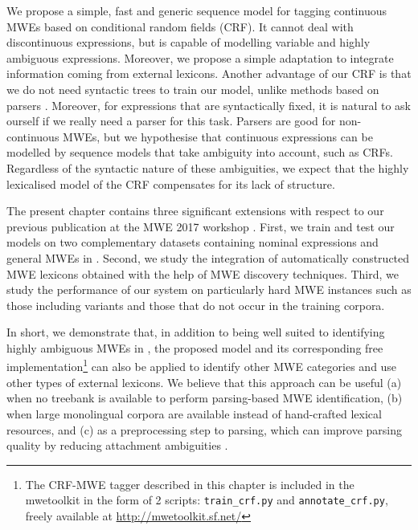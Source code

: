 \documentclass[output=paper,
modfonts
]{langscibook}
\begin{document}
We propose a simple, fast and generic sequence model for tagging continuous MWEs based on conditional random fields (CRF). 
It cannot deal with discontinuous expressions, but is capable of modelling variable and highly ambiguous expressions. 
Moreover, we propose a simple adaptation to integrate information coming from external lexicons. 
Another advantage of our CRF is that we do not need syntactic trees to train our model, unlike methods based on parsers \citep{leroux:hal-01074298,nasr:acl:2015,constant-nivre:acl:2016}. 
Moreover, for expressions that are syntactically fixed, it is natural to ask ourself if we really need a parser for this task. 
Parsers are good for non-continuous MWEs, but we hypothesise that continuous expressions can be modelled by sequence models that take ambiguity into account, such as CRFs. 
Regardless of the syntactic nature of these ambiguities, we expect that the highly lexicalised model of the CRF compensates for its lack of structure.

The present chapter contains three significant extensions with respect to our previous publication at the MWE 2017 workshop \citep{scholivet-ramisch:2017:MWE2017}. 
First, we train and test our models on two complementary datasets containing nominal expressions and general MWEs in . 
Second, we study the integration of automatically constructed MWE lexicons obtained with the help of MWE discovery techniques.
Third, we study the performance of our system on particularly hard MWE instances such as those including variants and those that do not occur in the training corpora.

In short, we demonstrate that, in addition to being well suited to identifying highly ambiguous MWEs in  \citep{scholivet-ramisch:2017:MWE2017}, the proposed model and its corresponding free implementation\footnote{The CRF-MWE tagger described in this chapter is included in the mwetoolkit in the form of 2 scripts: \texttt{train\_crf.py} and \texttt{annotate\_crf.py}, freely available at \url{http://mwetoolkit.sf.net/} } can also be applied to identify other MWE categories and use other types of external lexicons.
We believe that this approach can be useful (a) when no treebank is available to perform parsing-based MWE identification, (b) when large monolingual corpora are available instead of hand-crafted lexical resources, and (c) as a preprocessing step to parsing, which can improve parsing quality by reducing attachment ambiguities \citep{candito-constant:acl:2014,nivre2004}.
\end{document}
